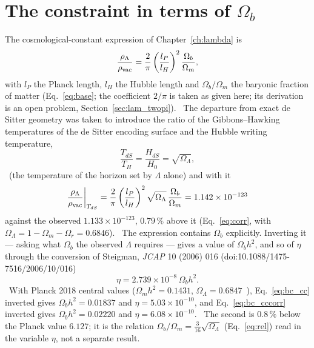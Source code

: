 \section{The constraint in terms of $\Omega_b$}\label{sec:bc_constraint}
The cosmological-constant expression of Chapter~\ref{ch:lambda} is
\begin{equation}\frac{\rho_\Lambda}{\rho_{\rm vac}}=\frac{2}{\pi}\left(\frac{l_P}{l_H}\right)^2\frac{\Omega_b}{\Omega_m},\label{eq:bc_cc}\end{equation}
with $l_P$ the Planck length, $l_H$ the Hubble length and $\Omega_b/\Omega_m$ the baryonic fraction of matter (Eq.~\eqref{eq:base};
the coefficient $2/\pi$ is taken as given here; its derivation is an open problem, Section~\ref{sec:lam_twopi}). \openprob\ The departure from exact de Sitter geometry was taken to
introduce the ratio of the Gibbons--Hawking temperatures of the de Sitter encoding surface and the Hubble writing temperature,
\begin{equation}\frac{T_{dS}}{T_H}=\frac{H_{dS}}{H_0}=\sqrt{\Omega_\Lambda},\label{eq:bc_tratio}\end{equation}
\derived\ (the temperature of the horizon set by $\Lambda$ alone) and with it
\begin{equation}\frac{\rho_\Lambda}{\rho_{\rm vac}}\bigg|_{T_{dS}}=\frac{2}{\pi}\left(\frac{l_P}{l_H}\right)^2\sqrt{\Omega_\Lambda}\,
\frac{\Omega_b}{\Omega_m}=1.142\times10^{-123}\label{eq:bc_cccorr}\end{equation}
against the observed $1.133\times10^{-123}$, $0.79\,\%$ above it (Eq.~\eqref{eq:corr}, with $\Omega_\Lambda=1-\Omega_m-\Omega_r=0.6846$). \fitted\ The expression contains $\Omega_b$
explicitly. Inverting it --- asking what $\Omega_b$ the observed $\Lambda$ requires --- gives a value of $\Omega_bh^2$, and so of $\eta$
through the conversion of Steigman, \emph{JCAP} 10 (2006) 016 (doi:\allowbreak{}10.1088/\allowbreak{}1475-7516/\allowbreak{}2006/\allowbreak{}10/\allowbreak{}016)
\begin{equation}\eta=2.739\times10^{-8}\,\Omega_bh^2 .\label{eq:bc_etaob}\end{equation}
\derived\ With Planck 2018 central values ($\Omega_mh^2=0.1431$, $\Omega_\Lambda=0.6847$~\cite{Planck2018VI}), Eq.~\eqref{eq:bc_cc}
inverted gives $\Omega_bh^2=0.01837$ and $\eta=5.03\times10^{-10}$, and Eq.~\eqref{eq:bc_cccorr} inverted gives $\Omega_bh^2=0.02220$ and
$\eta=6.08\times10^{-10}$. \calc\ The second is $0.8\,\%$ below the Planck value $6.127$; it is the relation
$\Omega_b/\Omega_m=\tfrac3{16}\sqrt{\Omega_\Lambda}$ (Eq.~\eqref{eq:rel}) read in the variable $\eta$, not a separate result.

